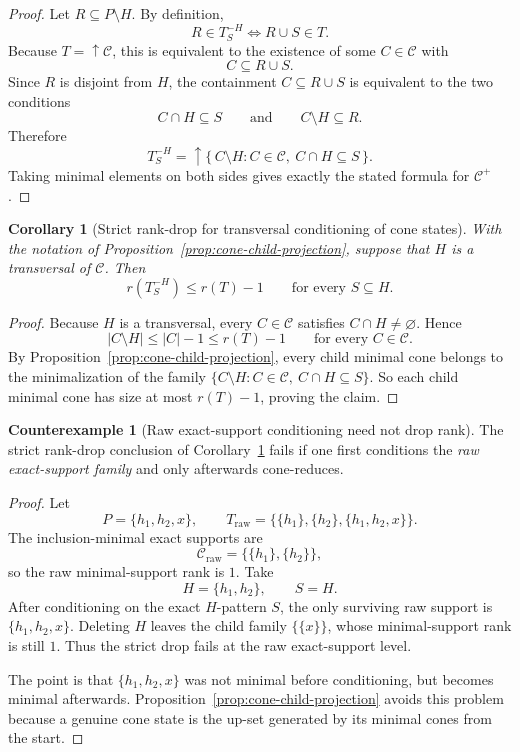 \documentclass[11pt]{article}
\newtheorem{corollary}[theorem]{Corollary}
\theoremstyle{definition}
\newtheorem{counterexample}[theorem]{Counterexample}
\newcommand{\1}{\mathbf{1}}
\begin{document}
\begin{proof}
Let $R\subseteq P\setminus H$.
By definition,
\[
R\in T_S^{-H}
\iff
R\cup S\in T.
\]
Because $T=\uparrow \mathcal C$, this is equivalent to the existence of some $C\in \mathcal C$ with
\[
C\subseteq R\cup S.
\]
Since $R$ is disjoint from $H$, the containment $C\subseteq R\cup S$ is equivalent to the two conditions
\[
C\cap H\subseteq S
\qquad\text{and}\qquad
C\setminus H\subseteq R.
\]
Therefore
\[
T_S^{-H}
=
\uparrow\{\, C\setminus H : C\in \mathcal C,\ C\cap H\subseteq S\,\}.
\]
Taking minimal elements on both sides gives exactly the stated formula for $\mathcal C^+$.
\end{proof}

\begin{corollary}[Strict rank-drop for transversal conditioning of cone states]\label{cor:cone-rank-drop}
With the notation of Proposition~\ref{prop:cone-child-projection}, suppose that $H$ is a transversal of $\mathcal C$.
Then
\[
r(T_S^{-H})\le r(T)-1
\qquad\text{for every }S\subseteq H.
\]
\end{corollary}

\begin{proof}
Because $H$ is a transversal, every $C\in \mathcal C$ satisfies $C\cap H\neq \varnothing$.
Hence
\[
|C\setminus H|\le |C|-1\le r(T)-1
\qquad\text{for every }C\in \mathcal C.
\]
By Proposition~\ref{prop:cone-child-projection}, every child minimal cone belongs to the minimalization of the family $\{C\setminus H: C\in \mathcal C,\ C\cap H\subseteq S\}$.
So each child minimal cone has size at most $r(T)-1$, proving the claim.
\end{proof}

\begin{counterexample}[Raw exact-support conditioning need not drop rank]\label{ce:raw-cone-rank}
The strict rank-drop conclusion of Corollary~\ref{cor:cone-rank-drop} fails if one first conditions the \emph{raw exact-support family} and only afterwards cone-reduces.
\end{counterexample}

\begin{proof}
Let
\[
P=\{h_1,h_2,x\},
\qquad
T_{\mathrm{raw}}=\bigl\{\{h_1\},\{h_2\},\{h_1,h_2,x\}\bigr\}.
\]
The inclusion-minimal exact supports are
\[
\mathcal C_{\mathrm{raw}}=\bigl\{\{h_1\},\{h_2\}\bigr\},
\]
so the raw minimal-support rank is $1$.
Take
\[
H=\{h_1,h_2\},
\qquad
S=H.
\]
After conditioning on the exact $H$-pattern $S$, the only surviving raw support is $\{h_1,h_2,x\}$.
Deleting $H$ leaves the child family $\{\{x\}\}$, whose minimal-support rank is still $1$.
Thus the strict drop fails at the raw exact-support level.

The point is that $\{h_1,h_2,x\}$ was not minimal before conditioning, but becomes minimal afterwards.
Proposition~\ref{prop:cone-child-projection} avoids this problem because a genuine cone state is the up-set generated by its minimal cones from the start.
\end{proof}
\end{document}
